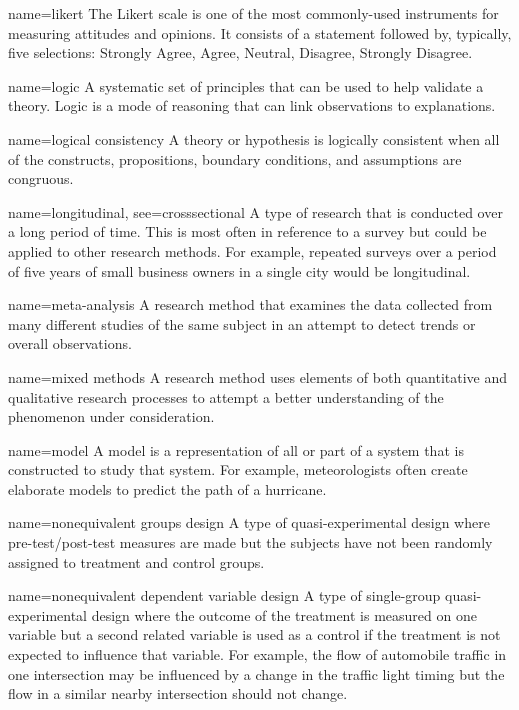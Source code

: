 {name={likert}}
{%
	The Likert scale is one of the most commonly-used instruments for measuring attitudes and opinions. It consists of a statement followed by, typically, five selections: Strongly Agree, Agree, Neutral, Disagree, Strongly Disagree.
}

{name={logic}}
{%
	A systematic set of principles that can be used to help validate a theory. Logic is a mode of reasoning that can link observations to explanations.
}

{name={logical consistency}}
{%
	A theory or hypothesis is logically consistent when all of the constructs, propositions, boundary conditions, and assumptions are congruous.
}

{name={longitudinal},
	see={crosssectional}}
{%
	A type of research that is conducted over a long period of time. This is most often in reference to a survey but could be applied to other research methods. For example, repeated surveys over a period of five years of small business owners in a single city would be longitudinal. 
}

{name={meta-analysis}}
{%
	A research method that examines the data collected from many different studies of the same subject in an attempt to detect trends or overall observations.
}

{name={mixed methods}}
{%
	A research method uses elements of both quantitative and qualitative research processes to attempt a better understanding of the phenomenon under consideration.
}

{name={model}}
{%
	A model is a representation of all or part of a system that is constructed to study that system. For example, meteorologists often create elaborate models to predict 	the path of a hurricane. 
}

{name={nonequivalent groups design}}
{%
	A type of quasi-experimental design where pre-test/post-test measures are made but the subjects have not been randomly assigned to treatment and control groups.
}

{name={nonequivalent dependent variable design}}
{%
	A type of single-group quasi-experimental design where the outcome of the treatment is measured on one variable but a second related variable is used as a control if the treatment is not expected to influence that variable. For example, the flow of automobile traffic in one intersection may be influenced by a change in the traffic light timing but the flow in a similar nearby intersection should not change.
}

